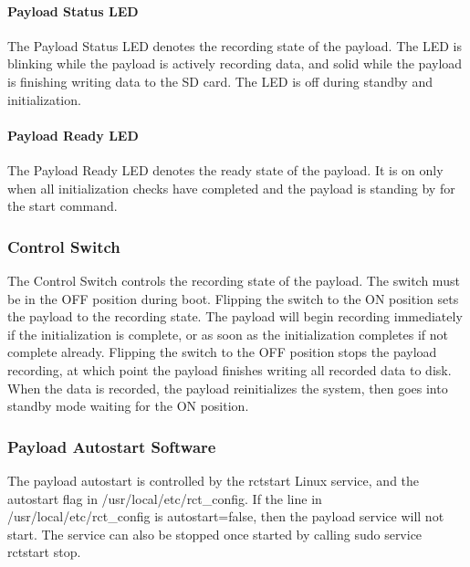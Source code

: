 \documentclass{report}
\begin{document}
								\paragraph{Payload Status LED}
									The Payload Status LED denotes the recording state of the payload.  The LED is blinking while the payload is actively recording data, and solid while the payload is finishing writing data to the SD card.  The LED is off during standby and initialization.
								\paragraph{Payload Ready LED}
									The Payload Ready LED denotes the ready state of the payload.  It is on only when all initialization checks have completed and the payload is standing by for the start command.
						\subsubsection{Control Switch}
							The Control Switch controls the recording state of the payload.  The switch must be in the OFF position during boot.  Flipping the switch to the ON position sets the payload to the recording state.  The payload will begin recording immediately if the initialization is complete, or as soon as the initialization completes if not complete already.  Flipping the switch to the OFF position stops the payload recording, at which point the payload finishes writing all recorded data to disk.  When the data is recorded, the payload reinitializes the system, then goes into standby mode waiting for the ON position.
						\subsubsection{Payload Autostart Software}
							The payload autostart is controlled by the rctstart Linux service, and the autostart flag in /usr/local/etc/rct\_config.  If the line in /usr/local/etc/rct\_config is autostart=false, then the payload service will not start.  The service can also be stopped once started by calling sudo service rctstart stop.
	\appendix
	\printglossaries
\end{document}
